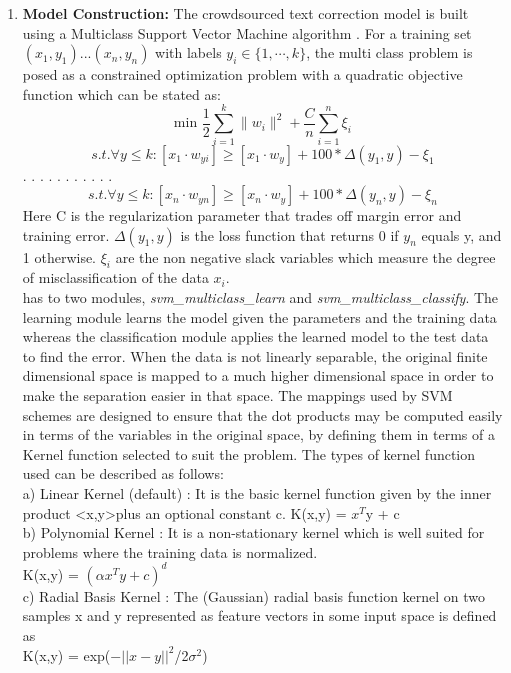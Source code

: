 \documentclass[letterpaper]{article}
\begin{document}
\begin{enumerate}
\item \textbf{Model Construction: } The crowdsourced text correction model is built using a Multiclass Support Vector Machine algorithm \cite{algo}. For a training set $(x_1,y_1) ... (x_n,y_n)$ with labels $y_i \in \{1, \cdots, k\}$, the multi class problem is posed as a constrained optimization problem with a quadratic objective function which can be stated as: \\
\begin{equation}
\text{min } \frac{1}{2} \sum_{i = 1}^{k} \parallel w_{i}\parallel^2 + \frac{C}{n} \sum_{i = 1}^{n}\xi_{i} 
\end{equation}
\begin{equation*}
s.t. \forall y \leq k : [x_{1} \cdot w_{yi}] \geq [x_{1} \cdot w_{y}] + 100*\Delta(y_{1},y)-\xi_{1}
\end{equation*}
 . . . . . . . . . . .
\begin{equation*}
s.t. \forall y \leq k : [x_{n} \cdot w_{yn}] \geq [x_{n} \cdot w_{y}] + 100*\Delta(y_{n},y)-\xi_{n} 
\end{equation*}
Here C is the regularization parameter that trades off margin error and training error. $\Delta(y_{1},y)$ is the loss function that returns 0 if $y_{n}$ equals y, and 1 otherwise. $\xi_{i}$ are the non negative slack variables which measure the degree of misclassification of the data $x_{i}$. \\
\cite{algo} has to two modules, \textit{svm\_multiclass\_learn} and \textit{svm\_multiclass\_classify}. The learning module learns the model given the parameters and the training data whereas the classification module applies the learned model to the test data to find the error. When the data is not linearly separable, the original finite dimensional space is mapped to a much higher dimensional space in order to make the separation easier in that space. The mappings used by SVM schemes are designed to ensure that the dot products may be computed easily in terms of the variables in the original space, by defining them in terms of a Kernel function selected to suit the problem. The types of kernel function used can be described as follows:\\
a) Linear Kernel (default) : It is the basic kernel function given by the inner product \textless x,y\textgreater plus an optional constant c. K(x,y) = $x^{T}$y + c \\
b) Polynomial Kernel : It is a non-stationary kernel which is well suited for problems where the training data is normalized. \\
K(x,y) = $(\alpha x^{T}y + c)^{d}$ \\
c) Radial Basis Kernel : The (Gaussian) radial basis function kernel on two samples x and y represented as feature vectors in some input space is defined as \\
K(x,y) = exp($-\lvert \lvert x-y\rvert\rvert^{2}$/2$\sigma^{2}$)



\end{enumerate}
\end{document}
